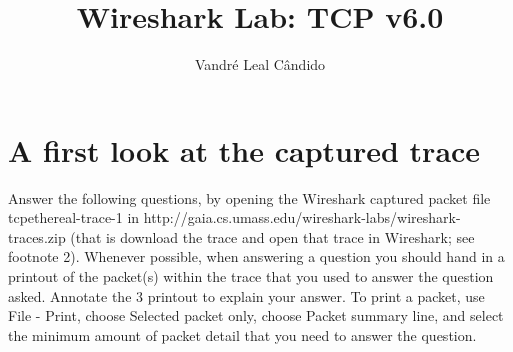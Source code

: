 \documentclass[11pt]{article}
\begin{document}
%
\author{Vandré Leal Cândido}
\title{Wireshark Lab: TCP v6.0}
\maketitle

\section{A first look at the captured trace}

\par Answer the following questions, by opening the Wireshark captured packet file tcpethereal-trace-1 in
http://gaia.cs.umass.edu/wireshark-labs/wireshark-traces.zip (that is download the trace and open that
trace in Wireshark; see footnote 2). Whenever possible, when answering a question you should hand
 in a printout of the packet(s) within the trace that you used to answer the question asked. Annotate the 3
printout to explain your answer. To print a packet, use File - Print, choose Selected packet only, choose Packet summary line, and select the minimum amount of packet detail that you need to answer the question.
\end{document}
